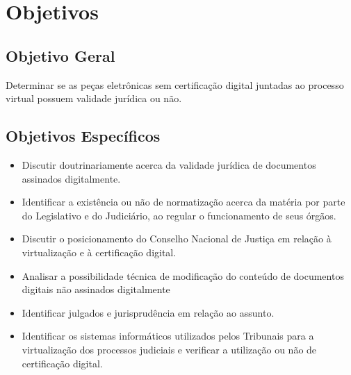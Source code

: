 \chapter{Objetivos}

\section{Objetivo Geral}

Determinar se as peças eletrônicas sem certificação digital
juntadas ao processo virtual possuem validade jurídica ou não.

\section{Objetivos Específicos}
\begin{itemize}
 \item Discutir doutrinariamente acerca da validade jurídica de
 documentos assinados digitalmente.
 \item Identificar a existência ou não de normatização acerca da
 matéria por parte do Legislativo e do Judiciário, ao regular o
 funcionamento de seus órgãos.
 \item Discutir o posicionamento do Conselho Nacional de Justiça
 em relação à virtualização e à certificação digital.
 \item Analisar a possibilidade técnica de modificação do
 conteúdo de documentos digitais não assinados digitalmente
 \item Identificar julgados e jurisprudência em relação ao assunto.
 \item Identificar os sistemas informáticos utilizados pelos
 Tribunais para a virtualização dos processos judiciais e
 verificar a utilização ou não de certificação digital.
\end{itemize}
